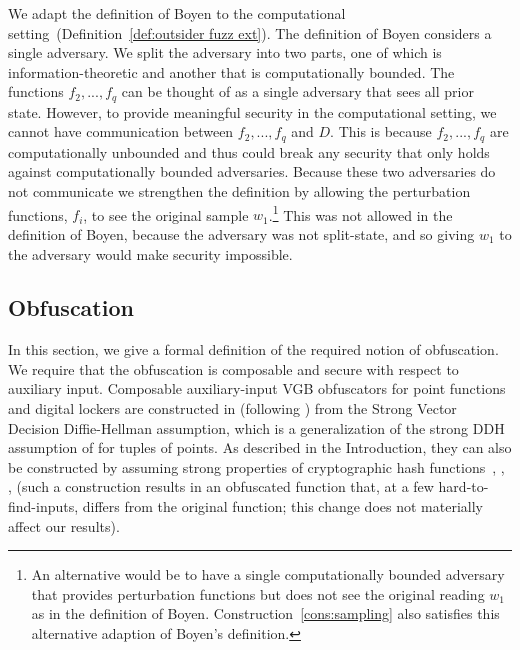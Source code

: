 \documentclass[11pt]{article}
\newcommand{\defref}[1]{\mbox{Definition~\ref{#1}}}
\newcommand{\consref}[1]{\mbox{Construction~\ref{#1}}}
\newcommand{\authnote}[2]{{\textcolor{red}{\textsf{#1 notes: }\textcolor{blue}{ #2}}\marginpar{\textcolor{red}{\textbf{!!!!!}}}}}
\newcommand{\authnote}[2]{}
\newcommand{\lnote}[1]{{\authnote{Leo}{#1}}}
\begin{document}
We adapt the definition of Boyen to the computational setting~(\defref{def:outsider fuzz ext}).  
The definition of Boyen considers a single adversary.  We split the adversary into two parts, one of which is information-theoretic and another that is computationally bounded.  The functions $f_2,..., f_q$ can be thought of as a single adversary that sees all prior state.  However, to provide meaningful security in the computational setting, we cannot have communication between $f_2,..., f_q$ and $D$.  This is because $f_2,..., f_q$ are computationally unbounded and thus could break any security that only holds against computationally bounded adversaries.
Because these two adversaries do not communicate we strengthen the definition by allowing the perturbation functions,  $f_i$, to see the original sample $w_1$.\footnote{An alternative would be to have a single computationally bounded adversary that provides perturbation functions but does not see the original reading $w_1$ as in the definition of Boyen.  \consref{cons:sampling} also satisfies this alternative adaption of Boyen's definition.}  This was not allowed in the definition of Boyen, because the adversary was not split-state, and so giving $w_1$ to the adversary would make security impossible.


\subsection{Obfuscation}
\label{sec:obfuscation def}

In this section, we give a formal definition of the required notion of obfuscation.
We require that the obfuscation is composable and secure with respect to auxiliary input. Composable auxiliary-input VGB obfuscators for point functions and digital lockers are constructed in \cite[Theorem 6.1]{bitansky2010strong} (following \cite{canetti2008obfuscating,CKVW10}) from the Strong Vector Decision Diffie-Hellman assumption, which is a generalization of the strong DDH assumption of \cite{canetti1997towards} for tuples of points. As described in the Introduction, they can also be constructed by assuming strong properties of cryptographic hash functions~\cite{canetti1997towards}, \cite[Section 4]{lynn2004positive}, \cite[Section 3.2]{canetti2008obfuscating}, \cite[Section 8.2.3]{dakdoukThesis} (such a construction results in an obfuscated function that, at a few hard-to-find-inputs, differs from the original function; this change does not materially affect our results).
\end{document}
